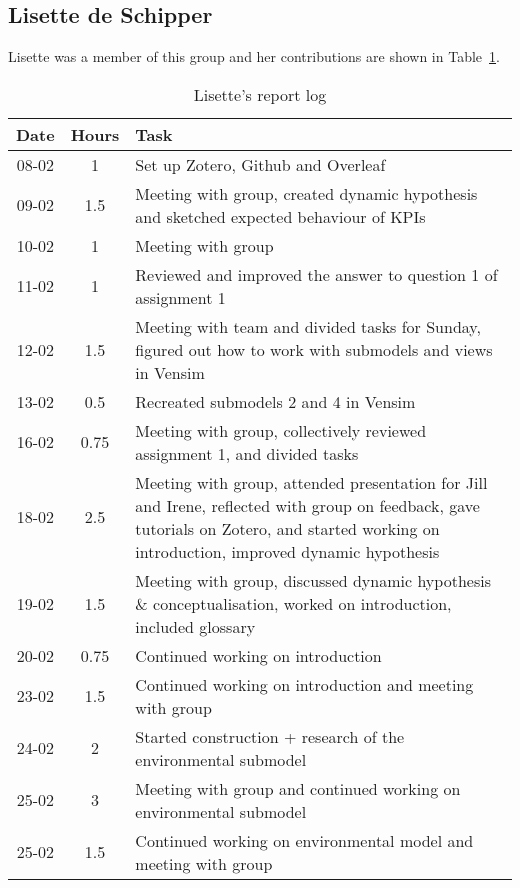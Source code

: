 \subsection{Lisette de Schipper}
Lisette was a member of this group and her contributions are shown in Table~\ref{tab:lisette_log}. 
\begin{longtable}[c]{c|c|m{35em}}
\caption{Lisette's report log}
\label{tab:lisette_log}\\
\textbf{Date}& \textbf{Hours} & \textbf{Task} \\
\hline
\endfirsthead
%
\endhead
%
08-02 & 1 & Set up Zotero, Github and Overleaf \\
09-02 & 1.5 & Meeting with group, created dynamic hypothesis and sketched expected behaviour of KPIs\\
10-02 & 1 & Meeting with group \\
11-02 & 1 & Reviewed and improved the answer to question 1 of assignment 1 \\
12-02 & 1.5 & Meeting with team and divided tasks for Sunday, figured out how to work with submodels and views in Vensim \\
13-02 & 0.5 & Recreated submodels 2 and 4 in Vensim \\
16-02 & 0.75 & Meeting with group, collectively reviewed assignment 1, and divided tasks \\
18-02 & 2.5 & Meeting with group, attended presentation for Jill and Irene, reflected with group on feedback, gave tutorials on Zotero, and started working on introduction, improved dynamic hypothesis \\
19-02 & 1.5 & Meeting with group, discussed dynamic hypothesis \& conceptualisation, worked on introduction, included glossary \\
20-02 & 0.75 & Continued working on introduction \\
23-02 & 1.5 & Continued working on introduction and meeting with group \\
24-02 & 2 & Started construction + research of the environmental submodel \\
25-02 & 3 & Meeting with group and continued working on environmental submodel \\
25-02 & 1.5 & Continued working on environmental model and meeting with group
\end{longtable}

